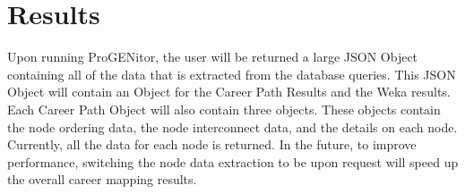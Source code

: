 \chapter{Results}
\label{chap:results}
Upon running ProGENitor, the user will be returned a large JSON Object
containing all of the data that is extracted from the database queries.  This
JSON Object will contain an Object for the Career Path Results and the Weka
results.  Each Career Path Object will also contain three objects.  These
objects contain the node ordering data, the node interconnect data, and the
details on each node.  Currently, all the data for each node is returned.  In
the future, to improve performance, switching the node data extraction to be
upon request will speed up the overall career mapping results.






